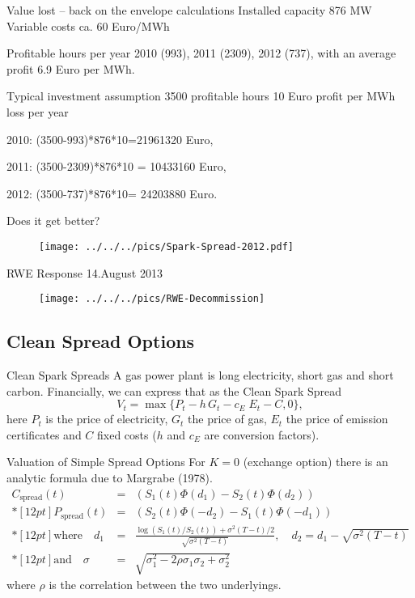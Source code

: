Value lost -- back on the envelope calculations 
	Installed capacity 876 MW 
	Variable costs ca. 60 Euro/MWh 
	
	Profitable hours per year 
		2010 (993), 
		2011 (2309), 
		2012 (737), 
	with an average profit 6.9 Euro per MWh. 

	Typical investment assumption 
		3500 profitable hours 
		10 Euro profit per MWh 
	loss per year 

	2010: (3500-993){*}876{*}10=21961320 Euro, 

	2011: (3500-2309){*}876{*}10 = 10433160 Euro, 

	2012: (3500-737){*}876{*}10= 24203880 Euro. 



Does it get better? 
\begin{figure}[htp]
\centering \texttt{[image: ../../../pics/Spark-Spread-2012.pdf]}
\end{figure}


RWE Response 14.August 2013 
\begin{figure}[htp]
\centering
\texttt{[image: ../../../pics/RWE-Decommission]}
\end{figure}


\subsection{Clean Spread Options}
Clean Spark Spreads
	A gas power plant is long electricity, short gas and short carbon. 
	Financially, we can express that as the Clean Spark Spread 
		\begin{equation}
		V_{t}=\max\{P_{t}-h\, G_{t}-c_{E}\; E_{t}-C,0\},\label{spark_spread_value}
		\end{equation}
	here $P_{t}$ is the price of electricity, $G_{t}$ the price of gas,
	$E_{t}$ the price of emission certificates and $C$ fixed costs ($h$
	and $c_{E}$ are conversion factors). 


Valuation of Simple Spread Options
	For $K=0$ (exchange option) there is an analytic formula due to Margrabe (1978). 
	$$\begin{array}{lll}
	 C_{\mbox{spread}}(t) & = & (S_1(t)\Phi(d_1)-S_2(t)\Phi(d_2))
	 \\*[12pt]
	 P_{\mbox{spread}}(t) & = & (S_2(t)\Phi(-d_2)-S_1(t)\Phi(-d_1))
	 \\*[12pt]
	 \mbox{where}\quad d_1 & = & \frac{\log(S_1(t)/S_2(t))+\sigma^{2}(T-t)/2}{\sqrt{\sigma^{2}(T-t)}},\quad d_2=d_1-\sqrt{\sigma^{2}(T-t)}
	 \\*[12pt]
	 \mbox{and}\quad \sigma & = & \sqrt{\sigma_1^2-2\rho\sigma_1\sigma_2+\sigma_2^2}
	\end{array}$$
	where $\rho$ is the correlation between the two underlyings.

